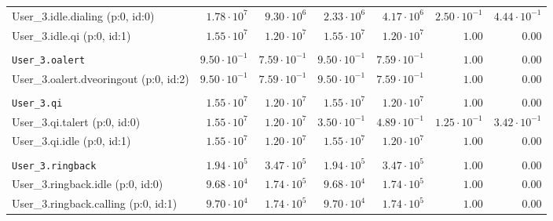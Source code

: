 \begin{table}[htbp]
{\begin{tabular}{lrrrrrr}
\hspace{3mm}User\_3.idle.dialing (p:0, id:0)          &  $1.78 \cdot 10^{7}$ &  $9.30 \cdot 10^{6}$ &  $2.33 \cdot 10^{6}$ &  $4.17 \cdot 10^{6}$ & $2.50 \cdot 10^{-1}$ & $4.44 \cdot 10^{-1}$ \\
\hspace{3mm}User\_3.idle.qi (p:0, id:1)               &  $1.55 \cdot 10^{7}$ &  $1.20 \cdot 10^{7}$ &  $1.55 \cdot 10^{7}$ &  $1.20 \cdot 10^{7}$ &               $1.00$ &               $0.00$ \\
\\[-8pt]\texttt{User\_3.oalert}                       & $9.50 \cdot 10^{-1}$ & $7.59 \cdot 10^{-1}$ & $9.50 \cdot 10^{-1}$ & $7.59 \cdot 10^{-1}$ &               $1.00$ &               $0.00$ \\
\hspace{3mm}User\_3.oalert.dveoringout (p:0, id:2)    & $9.50 \cdot 10^{-1}$ & $7.59 \cdot 10^{-1}$ & $9.50 \cdot 10^{-1}$ & $7.59 \cdot 10^{-1}$ &               $1.00$ &               $0.00$ \\
\\[-8pt]\texttt{User\_3.qi}                           &  $1.55 \cdot 10^{7}$ &  $1.20 \cdot 10^{7}$ &  $1.55 \cdot 10^{7}$ &  $1.20 \cdot 10^{7}$ &               $1.00$ &               $0.00$ \\
\hspace{3mm}User\_3.qi.talert (p:0, id:0)             &  $1.55 \cdot 10^{7}$ &  $1.20 \cdot 10^{7}$ & $3.50 \cdot 10^{-1}$ & $4.89 \cdot 10^{-1}$ & $1.25 \cdot 10^{-1}$ & $3.42 \cdot 10^{-1}$ \\
\hspace{3mm}User\_3.qi.idle (p:0, id:1)               &  $1.55 \cdot 10^{7}$ &  $1.20 \cdot 10^{7}$ &  $1.55 \cdot 10^{7}$ &  $1.20 \cdot 10^{7}$ &               $1.00$ &               $0.00$ \\
\\[-8pt]\texttt{User\_3.ringback}                     &  $1.94 \cdot 10^{5}$ &  $3.47 \cdot 10^{5}$ &  $1.94 \cdot 10^{5}$ &  $3.47 \cdot 10^{5}$ &               $1.00$ &               $0.00$ \\
\hspace{3mm}User\_3.ringback.idle (p:0, id:0)         &  $9.68 \cdot 10^{4}$ &  $1.74 \cdot 10^{5}$ &  $9.68 \cdot 10^{4}$ &  $1.74 \cdot 10^{5}$ &               $1.00$ &               $0.00$ \\
\hspace{3mm}User\_3.ringback.calling (p:0, id:1)      &  $9.70 \cdot 10^{4}$ &  $1.74 \cdot 10^{5}$ &  $9.70 \cdot 10^{4}$ &  $1.74 \cdot 10^{5}$ &               $1.00$ &               $0.00$ \\

\end{tabular}}
\end{table}
